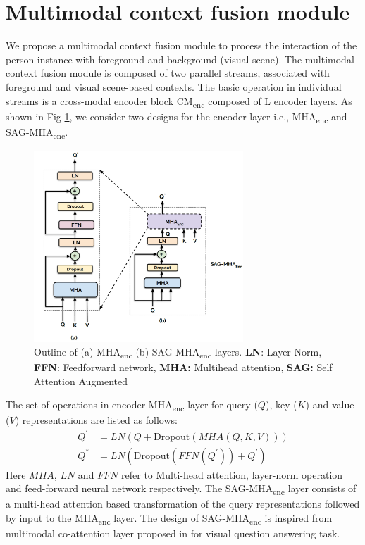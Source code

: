 \section{Multimodal context fusion module}
We propose a multimodal context fusion module to process the interaction of the person instance with foreground and background (visual scene). The multimodal context fusion module is composed of two parallel streams, associated with foreground and visual scene-based contexts. The basic operation in individual streams is a cross-modal encoder block CM\textsubscript{enc} composed of L encoder layers. As shown in Fig \ref{encoder block}, we consider two designs for the encoder layer i.e., MHA\textsubscript{enc} and SAG-MHA\textsubscript{enc}.  
\begin{figure}[h!]
    \centering
    \includegraphics[width=0.7\textwidth]{figures/SAG_MHA.png}
    \caption{Outline of (a) MHA\textsubscript{enc} (b) SAG-MHA\textsubscript{enc} layers. \textbf{LN}: Layer Norm, \textbf{FFN}: Feedforward network, \textbf{MHA:} Multihead attention, \textbf{SAG:} Self Attention Augmented}
    \label{encoder block}
\end{figure}
The set of operations in encoder MHA\textsubscript{enc} layer for query ($Q$), key ($K$) and value ($V$) representations are listed as follows:
\begin{equation} \label{MHAEnc operation}
\begin{split}
 Q^{'} & = LN(Q + \text{Dropout}(MHA(Q,K,V))) \\ 
Q^{*} & =LN(\text{Dropout}(FFN(Q^{'}))+Q^{'})
\end{split}
\end{equation}
Here $MHA$, $LN$ and $FFN$ refer to Multi-head attention, layer-norm operation and feed-forward neural network respectively. The SAG-MHA\textsubscript{enc} layer consists of a multi-head attention based transformation of the query representations followed by input to the MHA\textsubscript{enc} layer. The design of SAG-MHA\textsubscript{enc} is inspired from multimodal co-attention layer proposed in \cite{yu2019mcan} for visual question answering task.
